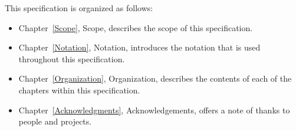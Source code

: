 \label{Organization}

This specification is organized as follows:
\begin{itemize}

\item
Chapter~\ref{Scope}, Scope, describes the scope of this specification.

\item
Chapter~\ref{Notation}, Notation, introduces the notation that is used
throughout this specification.

\item
Chapter~\ref{Organization}, Organization, describes the contents of
each of the chapters within this specification.

\item
Chapter~\ref{Acknowledgments}, Acknowledgements, offers a note of
thanks to people and projects.


\end{itemize}
